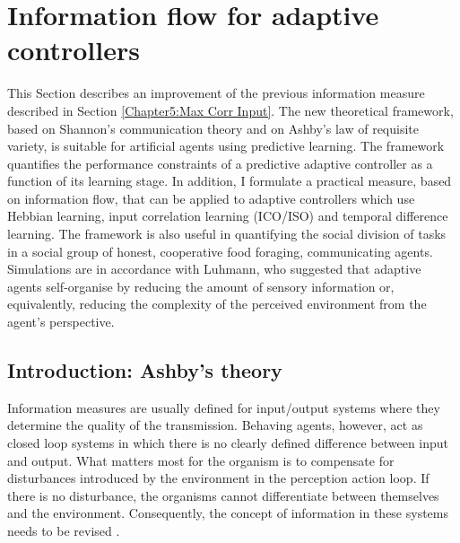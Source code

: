 \section{Information flow for adaptive controllers}
\label{Chapter6:Information Flow}
This Section describes an improvement of the previous information measure described
in Section \ref{Chapter5:Max Corr Input}.
The new theoretical framework, based on Shannon's communication theory
 and on Ashby's law of requisite variety, is suitable for artificial agents
using predictive learning.
The framework quantifies the performance constraints of a predictive adaptive
controller as a function of its learning stage.
In addition, I formulate a practical measure, based on information flow,
that can be applied to adaptive controllers which use Hebbian learning,
input correlation learning (ICO/ISO) and temporal difference learning.
The framework is also useful in quantifying the social division of tasks in a
social group of honest, cooperative food foraging, communicating agents.
Simulations are in accordance with Luhmann, who
suggested that adaptive agents self-organise by reducing the amount of sensory
information or, equivalently, reducing the complexity of the
perceived environment from the agent’s perspective.

\subsection{Introduction: Ashby's theory}

Information measures are usually defined for input/output systems where
they determine the quality of the transmission. Behaving agents,
however, act as closed loop systems in which there is no clearly defined
difference between input and output.
What matters most for the organism is to compensate for disturbances introduced by
 the environment in the perception action loop. If there is no disturbance,
the organisms cannot differentiate between themselves and the environment.
Consequently, the concept of information in these
systems needs to be revised \citep{RadicalConstruct}.

